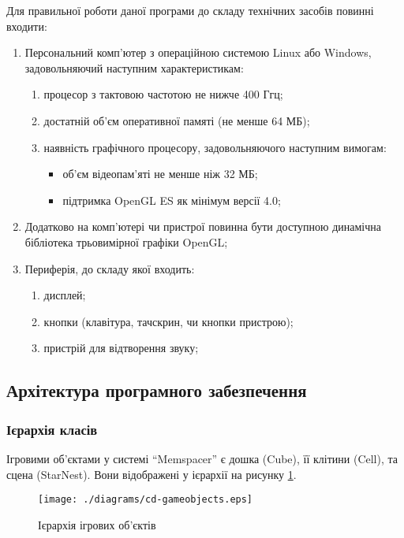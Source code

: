 Для правильної роботи даної програми до складу технічних засобів повинні входити:

\begin{enumerate}
  \item Персональний комп'ютер з операційною системою Linux або Windows, задовольняючий наступним характеристикам:
  \begin{enumerate}
    \item процесор з тактовою частотою не нижче 400 Ггц;
    \item достатній об'єм оперативної памяті (не менше 64 МБ);
    \item наявність графічного процесору, задовольняючого наступним вимогам:
    \begin{itemize}
      \item об'єм відеопам'яті не менше ніж 32 МБ;
      \item підтримка OpenGL ES як мінімум версії 4.0;
    \end{itemize}
  \end{enumerate}
  \item Додатково на комп'ютері чи пристрої повинна бути доступною динамічна бібліотека трьовимірної графіки OpenGL;
  \item Периферія, до складу якої входить:
  \begin{enumerate}
    \item дисплей;
    \item кнопки (клавітура, тачскрин, чи кнопки пристрою);
    \item пристрій для відтворення звуку;
  \end{enumerate}
\end{enumerate}

\subsection{Архітектура програмного забезпечення}

\subsubsection{Ієрархія класів}

Ігровими об'єктами у системі ``Memspacer'' є дошка (Cube), її клітини (Cell), та сцена (StarNest). Вони відображені у ієрархії на рисунку \ref{fig:cd-gameobjects}.

\begin{figure}[here]
  \centering\texttt{[image: ./diagrams/cd-gameobjects.eps]}
  \caption{Ієрархія ігрових об'єктів}
  \label{fig:cd-gameobjects}
\end{figure}

